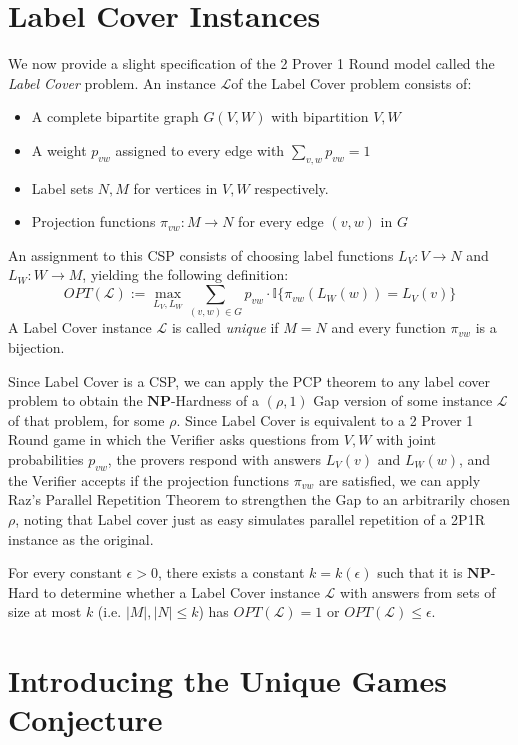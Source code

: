 \documentclass{article}
\newcommand{\NP}{\ensuremath{\mathbf{NP}}}
\newcommand{\e}{\epsilon}
\newcommand{\Ind}{\mathbb{I}}
\renewcommand{\L}{\ensuremath{\mathcal{L}}}
\newcommand{\OPT}{\ensuremath{\mathit{OPT}}}
\newcommand{\1}{\mathbbm{1}}
\begin{document}
\section{Label Cover Instances}

We now provide a slight specification of the 2 Prover 1 Round model called the \textit{Label Cover} problem. An instance \L of the Label Cover problem consists of:
\begin{itemize}
\item A complete bipartite graph $G(V, W)$ with bipartition $V, W$
\item A weight $p_{vw}$ assigned to every edge with $\sum_{v, w}p_{vw} = 1$
\item Label sets $N, M$ for vertices in $V, W$ respectively.
\item Projection functions $\pi_{vw} : M \to N$ for every edge $(v, w)$ in $G$
\end{itemize}
An assignment to this CSP consists of choosing label functions $L_V: V \to N$ and $L_W: W \to M$, yielding the following definition:
\[OPT(\L) := \max_{L_V, L_W} \sum_{(v, w) \in G}p_{vw}\cdot\Ind\{\pi_{vw}(L_W(w)) = L_V(v)\}\]
A Label Cover instance $\L$ is called \textit{unique} if $M = N$ and every function $\pi_{vw}$ is a bijection.


Since Label Cover is a CSP, we can apply the PCP theorem to any label cover problem to obtain the \NP-Hardness of a $(\rho, 1)$ Gap version of some instance $\L$ of that problem, for some $\rho$. Since Label Cover is equivalent to a 2 Prover 1 Round game in which the Verifier asks questions from $V, W$ with joint probabilities $p_{vw}$, the provers respond with answers $L_V(v)$ and $L_W(w)$, and the Verifier accepts if the projection functions $\pi_{vw}$ are satisfied, we can apply Raz's Parallel Repetition Theorem to strengthen the Gap to an arbitrarily chosen $\rho$, noting that Label cover just as easy simulates parallel repetition of a 2P1R instance as the original.
\begin{theorem}
  For every constant $\e > 0$, there exists a constant $k = k(\e)$ such that it is \NP-Hard to determine whether a Label Cover instance $\L$ with answers from sets of size at most $k$ (i.e. $|M|, |N| \le k$) has $\OPT(\L) = 1$ or $\OPT(\L) \le \e$.
\end{theorem}

\section{Introducing the Unique Games Conjecture}
\end{document}

